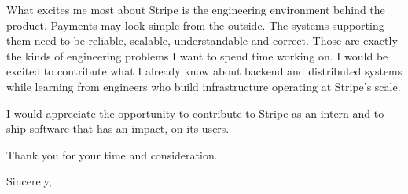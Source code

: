 \documentclass[10.5pt]{letter}
\begin{document}
\begin{letter}
What excites me most about Stripe is the engineering environment behind the product. Payments may look simple from the outside. The systems supporting them need to be reliable, scalable, understandable and correct. Those are exactly the kinds of engineering problems I want to spend time working on. I would be excited to contribute what I already know about backend and distributed systems while learning from engineers who build infrastructure operating at Stripe’s scale.

I would appreciate the opportunity to contribute to Stripe as an intern and to ship software that has an impact, on its users.

Thank you for your time and consideration.

  \closing{
  Sincerely,
}


\end{letter}
\end{document}
